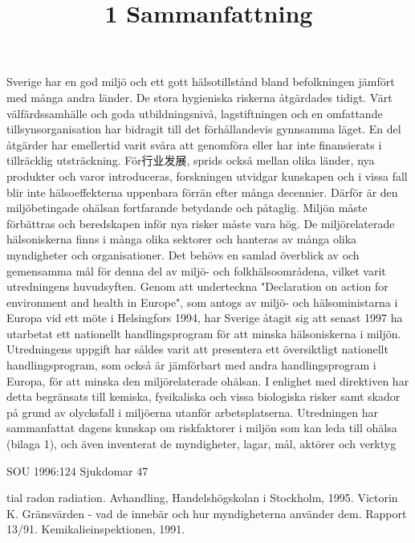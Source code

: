 \title{
1 Sammanfattning
}
Sverige har en god miljö och ett gott hälsotillstånd bland befolkningen jämfört med många andra länder. De stora hygieniska riskerna åtgärdades tidigt. Värt välfärdssamhälle och goda utbildningsnivå, lagstiftningen och en omfattande tillsynsorganisation har bidragit till det förhållandevis gynnsamma läget. En del åtgärder har emellertid varit svåra att genomföra eller har inte finansierats i tillräcklig utsträckning. För行业发展, sprids också mellan olika länder, nya produkter och varor introduceras, forskningen utvidgar kunskapen och i vissa fall blir inte hälsoeffekterna uppenbara förrän efter många decennier. Därför är den miljöbetingade ohälsan fortfarande betydande och påtaglig. Miljön måste förbättras och beredskapen inför nya risker måste vara hög.
De miljörelaterade hälsoniskerna finns i många olika sektorer och hanteras av många olika myndigheter och organisationer. Det behövs en samlad överblick av och gemensamma mål för denna del av miljö- och folkhälsoområdena, vilket varit utredningens huvudsyften. Genom att underteckna "Declaration on action for environment and health in Europe", som antogs av miljö- och hälsoministarna i Europa vid ett möte i Helsingfors 1994, har Sverige åtagit sig att senast 1997 ha utarbetat ett nationellt handlingsprogram för att minska hälsoniskerna i miljön.
Utredningens uppgift har såldes varit att presentera ett översiktligt nationellt handlingsprogram, som också är jämförbart med andra handlingsprogram i Europa, för att minska den miljörelaterade ohälsan. I enlighet med direktiven har detta begränsats till kemiska, fysikaliska och vissa biologiska risker samt skador på grund av olycksfall i miljöerna utanför arbetsplatserna. Utredningen har sammanfattat dagens kunskap om riskfaktorer i miljön som kan leda till ohälsa (bilaga 1), och även inventerat de myndigheter, lagar, mål, aktörer och verktyg

SOU 1996:124
Sjukdomar 47

tial radon radiation. Avhandling, Handelshögskolan i Stockholm, 1995.
Victorin K. Gränsvärden - vad de innebär och hur myndigheterna använder dem. Rapport 13/91. Kemikalieinspektionen, 1991.

